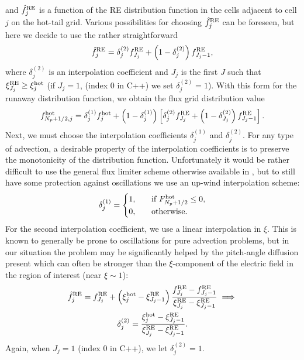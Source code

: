 \documentclass{notes}
\begin{document}
    and $\hat{f}^{\rm RE}_j$ is a function of the RE distribution function in
    the cells adjacent to cell $j$ on the hot-tail grid. Various possibilities
    for choosing $\hat{f}^{\rm RE}_j$ can be foreseen, but here we decide to
    use the rather straightforward
    \begin{equation}
        \hat{f}^{\rm RE}_j = \delta^{(2)}_j f^{\rm RE}_{J_j} +
            \left( 1 - \delta^{(2)}_j \right) f^{\rm RE}_{J_j-1},
    \end{equation}
    where $\delta^{(2)}_j$ is an interpolation coefficient and $J_j$ is the
    first $J$ such that $\xi^{\rm RE}_{J_j}\geq\xi^{\rm hot}_j$ (if $J_j=1$,
    (index 0 in C++) we set $\delta^{(2)}_j = 1$). With this form for the
    runaway distribution function, we obtain the flux grid distribution value
    \begin{equation}
        f^{\rm hot}_{N_p+1/2,j} = \delta^{(1)}_j f_j^{\rm hot} +
            \left( 1 - \delta^{(1)}_j \right)\left[
                \delta^{(2)}_j f_{J_j}^{\rm RE} +
                \left( 1-\delta^{(2)}_{J_j} \right) f_{J_j-1}^{\rm RE}
            \right].
    \end{equation}
    Next, we must choose the interpolation coefficients $\delta^{(1)}_j$ and
    $\delta^{(2)}_j$. For any type of advection, a desirable property of the
    interpolation coefficients is to preserve the monotonicity of the
    distribution function. Unfortunately it would be rather difficult to use
    the general flux limiter scheme otherwise available in \DREAM, but to still
    have some protection against oscillations we use an up-wind interpolation
    scheme:
    \begin{equation}
        \delta^{(1)}_j = \begin{cases}
            1, \quad&\text{if } F_{N_p+1/2}^{\rm hot} \leq 0,\\
            0, \quad&\text{otherwise}.
        \end{cases}
    \end{equation}
    For the second interpolation coefficient, we use a linear interpolation in
    $\xi$. This is known to generally be prone to oscillations for pure
    advection problems, but in our situation the problem may be significantly
    helped by the pitch-angle diffusion present which can often be stronger
    than the $\xi$-component of the electric field in the region of interest
    (near $\xi\sim1$):
    \begin{equation}
        \begin{gathered}
            \hat{f}^{\rm RE}_j = f^{\rm RE}_{J_j} +
                \left( \xi^{\rm hot}_j - \xi^{\rm RE}_{J_j-1} \right)
                \frac{f_{J_j}^{\rm RE} - f_{J_j-1}^{\rm RE}}
                {\xi^{\rm RE}_{J_j} - \xi^{\rm RE}_{J_j-1}} \implies\\
                \delta^{(2)}_j = \frac{\xi^{\rm hot}_j - \xi^{\rm RE}_{J_j-1}}
                {\xi^{\rm RE}_{J_j} - \xi^{\rm RE}_{J_j-1}}.
        \end{gathered}
    \end{equation}
    Again, when $J_j=1$ (index 0 in C++), we let $\delta^{(2)}_j = 1$.
\end{document}
